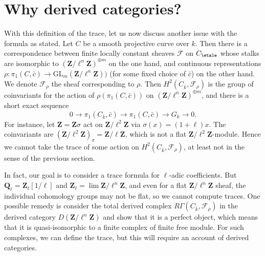 \section{Why derived categories?}
\label{trace-section-derived-categories-why}
With this definition of the trace, let us now discuss another issue with the
formula as stated. Let $C$ be a smooth projective curve over $k$. Then there is
a correspondence between finite locally constant sheaves $\mathcal{F}$ on
$C_\etale$ whose stalks are isomorphic to
${(\mathbf{Z}/\ell^n\mathbf{Z})}^{\oplus m}$ on the one hand, and continuous
representations $\rho : \pi_1 (C, \bar c) \to
\text{GL}_m(\mathbf{Z}/\ell^n\mathbf{Z}))$ (for some fixed choice of $\bar c$)
on the other hand. We denote $\mathcal{F}_\rho$ the sheaf corresponding to
$\rho$. Then $H^2 (C_{\bar k}, \mathcal{F}_\rho)$ is the group of coinvariants
for the action of $\rho(\pi_1 (C, \bar c))$ on
${(\mathbf{Z}/\ell^n\mathbf{Z})}^{\oplus m}$, and there is a short exact
sequence
$$
0 \longrightarrow \pi_1 (C_{\bar k}, \bar c) \longrightarrow \pi_1 (C, \bar c)
\longrightarrow G_k \longrightarrow 0.
$$
For instance, let $\mathbf{Z} = \mathbf{Z} \sigma$ act on
$\mathbf{Z}/\ell^2\mathbf{Z}$ via $\sigma(x) = (1+\ell) x$. The coinvariants
are $(\mathbf{Z}/\ell^2\mathbf{Z})_{\sigma} = \mathbf{Z}/\ell\mathbf{Z}$, which
is not a flat $\mathbf{Z}/\ell^2\mathbf{Z}$-module. Hence we cannot take the
trace of some action on $H^2(C_{\bar k}, \mathcal{F}_\rho)$, at least not in
the sense of the previous section.

\medskip\noindent
In fact, our goal is to consider a trace formula for $\ell$-adic coefficients.
But $\mathbf{Q}_\ell = \mathbf{Z}_\ell[1/\ell]$ and $\mathbf{Z}_\ell =
\lim \mathbf{Z}/\ell^n\mathbf{Z}$, and even for a flat
$\mathbf{Z}/\ell^n\mathbf{Z}$ sheaf, the individual cohomology groups may not
be flat, so we cannot compute traces. One possible remedy is consider the total
derived complex $R\Gamma(C_{\bar k}, \mathcal{F}_\rho)$ in the derived category
$D(\mathbf{Z}/\ell^n\mathbf{Z})$ and show that it is a perfect object, which
means that it is quasi-isomorphic to a finite complex of finite free module.
For such complexes, we can define the trace, but this will require an account
of derived categories.

